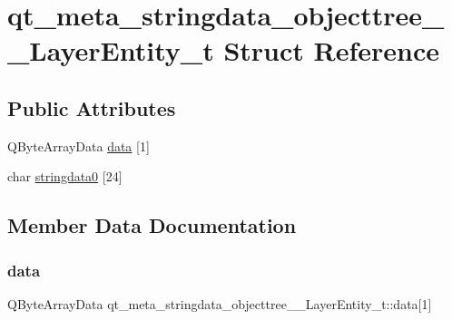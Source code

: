 \hypertarget{structqt__meta__stringdata__objecttree_____layer_entity__t}{}\section{qt\+\_\+meta\+\_\+stringdata\+\_\+objecttree\+\_\+\+\_\+\+Layer\+Entity\+\_\+t Struct Reference}
\label{structqt__meta__stringdata__objecttree_____layer_entity__t}
\subsection*{Public Attributes}
\begin{DoxyCompactItemize}
\item 
Q\+Byte\+Array\+Data \mbox{\hyperlink{structqt__meta__stringdata__objecttree_____layer_entity__t_aa5d62343119025c680c6fc99d08befbe}{data}} \mbox{[}1\mbox{]}
\item 
char \mbox{\hyperlink{structqt__meta__stringdata__objecttree_____layer_entity__t_a80f84ef43c03f9842fc0a62847d1196f}{stringdata0}} \mbox{[}24\mbox{]}
\end{DoxyCompactItemize}


\subsection{Member Data Documentation}
\mbox{\label{structqt__meta__stringdata__objecttree_____layer_entity__t_aa5d62343119025c680c6fc99d08befbe}} 
\subsubsection{\texorpdfstring{data}{data}}
{\footnotesize\ttfamily Q\+Byte\+Array\+Data qt\+\_\+meta\+\_\+stringdata\+\_\+objecttree\+\_\+\+\_\+\+Layer\+Entity\+\_\+t\+::data\mbox{[}1\mbox{]}}

\mbox{\label{structqt__meta__stringdata__objecttree_____layer_entity__t_a80f84ef43c03f9842fc0a62847d1196f}} 
